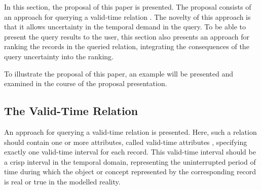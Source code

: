 In this section, the proposal of this paper is presented. The proposal consists of an approach for querying a valid-time relation \cite{Dyreson1994}. The novelty of this approach is that it allows uncertainty in the temporal demand in the query. To be able to present the query results to the user, this section also presents an approach for ranking the records in the queried relation, integrating the consequences of the query uncertainty into the ranking.

To illustrate the proposal of this paper, an example will be presented and examined in the course of the proposal presentation.


\subsection{The Valid-Time Relation}
An approach for querying a valid-time relation \cite{Dyreson1994} is presented. Here, such a relation should contain one or more attributes, called valid-time attributes \cite{Dyreson1994}, specifying exactly one valid-time interval \cite{Dyreson1994} for each record. This valid-time interval should be a crisp interval in the temporal domain, representing the uninterrupted period of time during which the object or concept represented by the corresponding record is real or true in the modelled reality.

